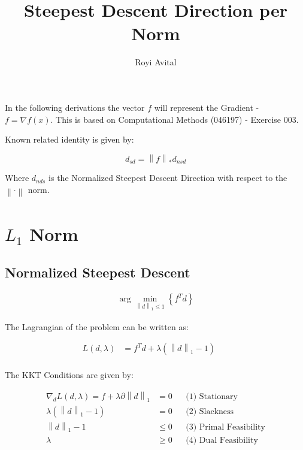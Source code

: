 \documentclass[]{article}
\title{Steepest Descent Direction per Norm}
\author{Royi Avital}
\newcommand{\MyParen}[1]{\left( #1 \right)}
\newcommand{\MyBrace}[1]{\left\lbrace #1 \right\rbrace}
\newcommand{\MyNorm}[2]{{\left\| #1 \right\|}_{#2}}
\begin{document}
	
	\maketitle
	

	\tableofcontents
	
	\newpage
	
	In the following derivations the vector $ f $ will represent the Gradient - $ f = \nabla f \MyParen{x} $.
	This is based on Computational Methods (046197) - Exercise 003.
	
	Known related identity is given by:
	
	$$ {d}_{sd} = \MyNorm{f}{\ast} {d}_{nsd} $$
	
	Where $ {d}_{nds} $ is the Normalized Steepest Descent Direction with respect to the $ \MyNorm{\cdot}{} $ norm.
	
	\section{$ {L}_{1} $ Norm}
	
	\subsection{Normalized Steepest Descent}
	
	\begin{align*}
	\arg \min_{ \MyNorm{d}{1} \leq 1 } \MyBrace{ {f}^{T} d }
	\end{align*}
	
	The Lagrangian of the problem can be written as:
	
	\begin{align*}
	L \left( d, \lambda \right) & = {f}^{T} d + \lambda \left( {\left\| d \right\|}_{1} - 1 \right) && \text{} \\
	\end{align*}
	
	The KKT Conditions are given by:
	
	\begin{align*}
	{\nabla}_{d} L \MyParen{ d, \lambda } = f + \lambda \partial \MyNorm{d}{1} & = 0 && \text{(1) Stationary} \\
	\lambda \MyParen{ \MyNorm{d}{1}  - 1 } 	& = 0 		&& \text{(2) Slackness} \\
	\MyNorm{d}{1} - 1						& \leq 0 	&& \text{(3) Primal Feasibility} \\
	\lambda 							& \geq 0 	&& \text{(4) Dual Feasibility} \\
	\end{align*}
	
\end{document}
